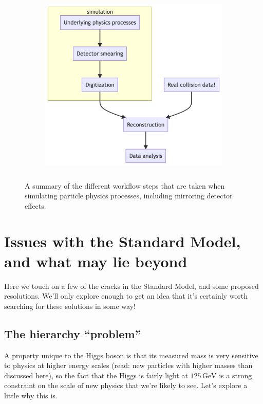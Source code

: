\documentclass[
  11pt,
  numbers=noendperiod]{book}
\begin{document}
\begin{figure}

{\centering 

\begin{figure}[H]

{\centering \includegraphics[width=5.5in,height=3.5in]{./physics_files/figure-latex/mermaid-figure-1.png}

}

\end{figure}

}

\caption{\label{fig-simulator}A summary of the different workflow steps
that are taken when simulating particle physics processes, including
mirroring detector effects.}

\end{figure}

\hypertarget{sec-bsm}{%
\section{Issues with the Standard Model, and what may lie
beyond}\label{sec-bsm}}

Here we touch on a few of the cracks in the Standard Model, and some
proposed resolutions. We'll only explore enough to get an idea that it's
certainly worth searching for these solutions in some way!

\hypertarget{the-hierarchy-problem}{%
\subsection{The hierarchy ``problem''}\label{the-hierarchy-problem}}

A property unique to the Higgs boson is that its measured mass is very
sensitive to physics at higher energy scales (read: new particles with
higher masses than discussed here), so the fact that the Higgs is fairly
light at \(125\,\text{GeV}\) is a strong constraint on the scale of new
physics that we're likely to see. Let's explore a little why this is.
\end{document}
